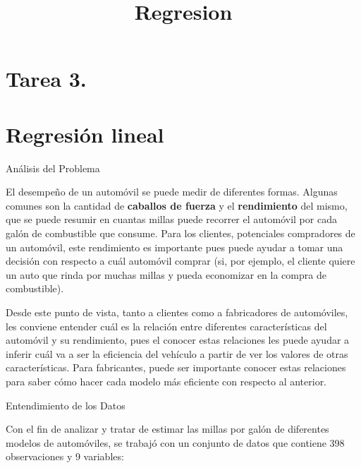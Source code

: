 \documentclass[]{article}
\title{Regresion}
\author{}
\date{}
\begin{document}
\maketitle

\hypertarget{tarea-3.}{%
\section{Tarea 3.}\label{tarea-3.}}

\hypertarget{regresion-lineal}{%
\section{Regresión lineal}\label{regresion-lineal}}

Análisis del Problema

El desempeño de un automóvil se puede medir de diferentes formas.
Algunas comunes son la cantidad de \textbf{caballos de fuerza} y el
\textbf{rendimiento} del mismo, que se puede resumir en cuantas millas
puede recorrer el automóvil por cada galón de combustible que consume.
Para los clientes, potenciales compradores de un automóvil, este
rendimiento es importante pues puede ayudar a tomar una decisión con
respecto a cuál automóvil comprar (si, por ejemplo, el cliente quiere un
auto que rinda por muchas millas y pueda economizar en la compra de
combustible).

Desde este punto de vista, tanto a clientes como a fabricadores de
automóviles, les conviene entender cuál es la relación entre diferentes
características del automóvil y su rendimiento, pues el conocer estas
relaciones les puede ayudar a inferir cuál va a ser la eficiencia del
vehículo a partir de ver los valores de otras características. Para
fabricantes, puede ser importante conocer estas relaciones para saber
cómo hacer cada modelo más eficiente con respecto al anterior.

Entendimiento de los Datos

Con el fin de analizar y tratar de estimar las millas por galón de
diferentes modelos de automóviles, se trabajó con un conjunto de datos
que contiene 398 observaciones y 9 variables:
\end{document}
